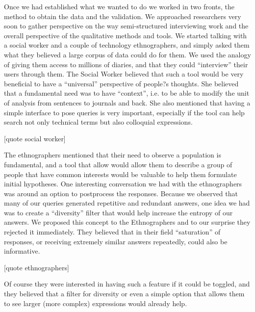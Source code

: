 \documentclass{sigchi}
\begin{document}
Once we had established what we wanted to do we worked in two fronts, the method to obtain the data and the validation. We approached researchers very soon to gather perspective on the way semi-structured interviewing work and the overall perspective of the qualitative methods and tools. We started talking with a social worker and a couple of technology ethnographers, and simply asked them what they believed a large corpus of data could do for them. We used the analogy of giving them access to millions of diaries, and that they could ``interview'' their users through them. The Social Worker believed that such a tool would be very beneficial to have a ``universal'' perspective of people?s thoughts. She believed that a fundamental need was to have ``context'', i.e. to be able to modify the unit of analysis from sentences to journals and back. She also mentioned that having a simple interface to pose queries is very important, especially if the tool can help search not only technical terms but also colloquial expressions. 

[quote social worker]

The ethnographers mentioned that their need to observe a population is fundamental, and a tool that allow would allow them to describe a group of people that have common interests would be valuable to help them formulate initial hypotheses. One interesting conversation we had with the ethnographers was around an option to postprocess the responses. Because we observed that many of our queries generated repetitive and redundant answers, one idea we had was to create a ``diversity'' filter that would help increase the entropy of our answers. We proposed this concept to the Ethnographers and to our surprise they rejected it immediately. They believed that in their field ``saturation'' of responses, or receiving extremely similar answers repeatedly, could also be informative.

[quote ethnographers]

Of course they were interested in having such a feature if it could be toggled, and they believed that a filter for diversity or even a simple option that allows them to see larger (more complex) expressions would already help.
\end{document}
